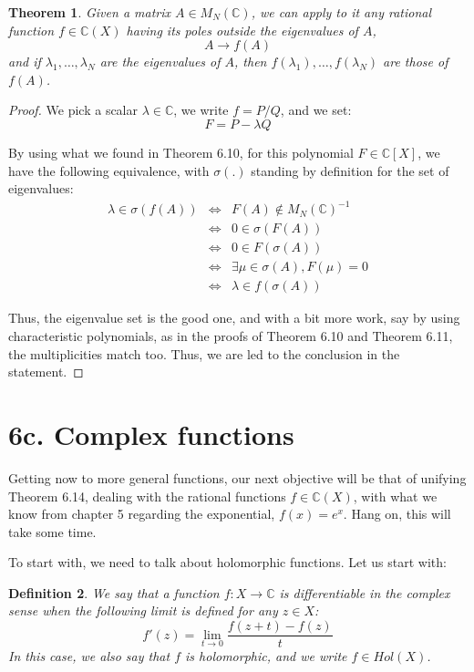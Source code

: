 \documentclass[12pt]{amsbook}
\newtheorem{theorem}{Theorem}[chapter]
\newtheorem{definition}[theorem]{Definition}
\begin{document}

\begin{theorem}
Given a matrix $A\in M_N(\mathbb C)$, we can apply to it any rational function $f\in\mathbb C(X)$ having its poles outside the eigenvalues of $A$,
$$A\to f(A)$$
and if $\lambda_1,\ldots,\lambda_N$ are the eigenvalues of $A$, then $f(\lambda_1),\ldots,f(\lambda_N)$ are those of $f(A)$.
\end{theorem}

\begin{proof}
We pick a scalar $\lambda\in\mathbb C$, we write $f=P/Q$, and we set:
$$F=P-\lambda Q$$

By using what we found in Theorem 6.10, for this polynomial $F\in\mathbb C[X]$, we have the following equivalence, with $\sigma(.)$ standing by definition for the set of eigenvalues:
\begin{eqnarray*}
\lambda\in\sigma(f(A))
&\iff&F(A)\notin M_N(\mathbb C)^{-1}\\
&\iff&0\in\sigma(F(A))\\
&\iff&0\in F(\sigma(A))\\
&\iff&\exists\mu\in\sigma(A),F(\mu)=0\\
&\iff&\lambda\in f(\sigma(A))
\end{eqnarray*}

Thus, the eigenvalue set is the good one, and with a bit more work, say by using characteristic polynomials, as in the proofs of Theorem 6.10 and Theorem 6.11, the multiplicities match too. Thus, we are led to the conclusion in the statement.
\end{proof}

\section*{6c. Complex functions}

Getting now to more general functions, our next objective will be that of unifying Theorem 6.14, dealing with the rational functions $f\in\mathbb C(X)$, with what we know from chapter 5 regarding the exponential, $f(x)=e^x$. Hang on, this will take some time.

\bigskip

To start with, we need to talk about holomorphic functions. Let us start with:


\begin{definition}
We say that a function $f:X\to\mathbb C$ is differentiable in the complex sense when the following limit is defined for any $z\in X$:
$$f'(z)=\lim_{t\to0}\frac{f(z+t)-f(z)}{t}$$
In this case, we also say that $f$ is holomorphic, and we write $f\in Hol(X)$.
\end{definition}
\end{document}
